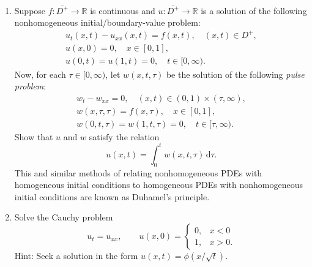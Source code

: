 \begin{enumerate}[label=\thesection.\arabic*.,ref=\thesection.\arabic*,start=21,series=book-problems]
\item\label{ex:duhamel-heat-pulse} Suppose $f:\overline{D^+}\to\mathbb{R}$ is continuous and $u:\overline{D^+}\to\mathbb{R}$ is a solution of the following nonhomogeneous initial/boundary-value problem:
\[
\begin{gathered}
u_t(x,t)-u_{xx}(x,t)=f(x,t),\quad(x,t)\in D^+,\\
u(x,0)=0,\quad x\in[0,1],\\
u(0,t)=u(1,t)=0,\quad t\in[0,\infty).
\end{gathered}
\]
Now, for each $\tau\in[0,\infty)$, let $w(x,t,\tau)$ be the solution of the following \emph{pulse problem}:
\[
\begin{gathered}
w_t-w_{xx}=0,\quad(x,t)\in(0,1)\times(\tau,\infty),\\
w(x,\tau,\tau)=f(x,\tau),\quad x\in[0,1],\\
w(0,t,\tau)=w(1,t,\tau)=0,\quad t\in[\tau,\infty).
\end{gathered}
\]
Show that $u$ and $w$ satisfy the relation
\[
u(x,t)=\int_0^tw(x,t,\tau)\,\mathrm{d}\tau.
\]
This and similar methods of relating nonhomogeneous PDEs with homogeneous initial conditions to homogeneous PDEs with nonhomogeneous initial conditions are known as Duhamel's principle.

\item\label{ex:heat-step-cauchy-problem} Solve the Cauchy problem
\[
u_t=u_{xx},\qquad u(x,0)=\begin{cases}0,&x<0\\1,&x>0.\end{cases}
\]
Hint: Seek a solution in the form $u(x,t)=\phi(x/\sqrt t)$.

\end{enumerate}
